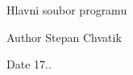 Hlavni soubor programu \begin{DoxyAuthor}{Author}
Stepan Chvatik 
\end{DoxyAuthor}
\begin{DoxyDate}{Date}
17.. 
\end{DoxyDate}

